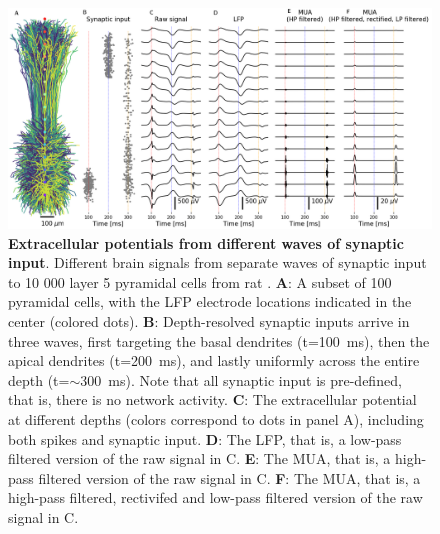 \documentclass[preprint,11pt,authoryear]{elsarticle}
\begin{document}
\begin{figure}[!ht]
\begin{center}
\includegraphics[width=1\textwidth]{population_LFP_MUA.png}
\end{center}
\caption{\textbf{Extracellular potentials from different waves of synaptic input}. Different brain signals from separate waves of synaptic input to 10 000 layer 5 pyramidal cells from rat \citep{Hay2011}.
{\bf A}: A subset of 100 pyramidal cells, with the LFP electrode locations indicated in the center (colored dots).
{\bf B}: Depth-resolved synaptic inputs arrive in three waves, first targeting the basal dendrites (t=100~ms), then the apical dendrites (t=200~ms), and lastly uniformly across the entire depth (t=$\sim$300~ms). Note that all synaptic input is pre-defined, that is, there is no network activity.
{\bf C}: The extracellular potential at different depths (colors correspond to dots in panel A), including both spikes and synaptic input.
{\bf D}: The LFP, that is, a low-pass filtered version of the raw signal in C.
{\bf E}: The MUA, that is, a high-pass filtered version of the raw signal in C.
{\bf F}: The MUA, that is, a high-pass filtered, rectivifed and low-pass filtered version of the raw signal in C.
}
\label{fig:LFP_MUA}
\end{figure}
\end{document}
